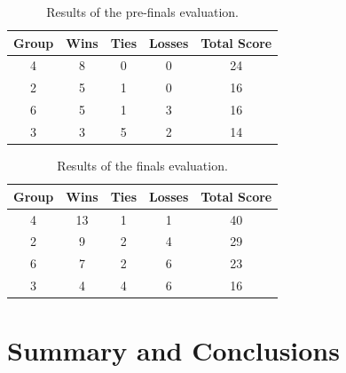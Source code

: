 \documentclass[a4paper,12pt]{article}
\begin{document}
\begin{table}[!hptb]
  \centering
  \begin{tabular}{|c|c|c|c|c|}
    \hline
    \textbf{Group} & \textbf{Wins} & \textbf{Ties} & \textbf{Losses} & \textbf{Total Score} \\
    \hline
    4 & 8 & 0 & 0 & 24 \\
    \hline
    2 & 5 & 1 & 0 & 16 \\
    \hline
    6 & 5 & 1 & 3 & 16 \\
    \hline
    3 & 3 & 5 & 2 & 14 \\
    \hline
  \end{tabular}
  \caption{Results of the pre-finals evaluation.}
  \label{tab:results_prefinals}
\end{table}


\begin{table}[!hptb]
  \centering
  \begin{tabular}{|c|c|c|c|c|}
    \hline
    \textbf{Group} & \textbf{Wins} & \textbf{Ties} & \textbf{Losses} & \textbf{Total Score} \\
    \hline
    4 & 13 & 1 & 1 & 40 \\
    \hline
    2 & 9 & 2 & 4 & 29 \\
    \hline
    6 & 7 & 2 & 6 & 23 \\
    \hline
    3 & 4 & 4 & 6 & 16 \\
    \hline
  \end{tabular}
  \caption{Results of the finals evaluation.}
  \label{tab:results_finals}
\end{table}














\section{Summary and Conclusions}
\label{sec:conclusion}



\end{document}
